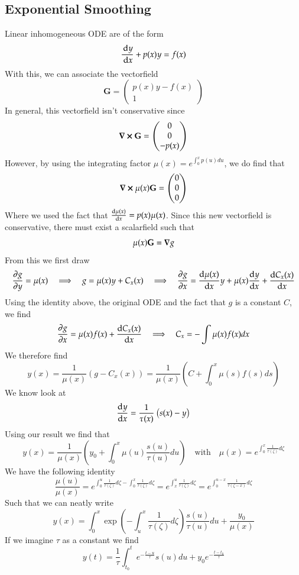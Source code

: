 \documentclass[]{scrartcl}
\begin{document}
\subsection{Exponential Smoothing}
Linear inhomogeneous ODE are of the form
$$
\frac{\dl y}{\dl x} + p(x)y = f(x) 
$$
With this, we can associate the vectorfield
$$
\mathbf{G} = 
\begin{pmatrix}
	p(x)y - f(x) \\ 1
\end{pmatrix}
$$
In general, this vectorfield isn't conservative since
$$
\curl{\mathbf{G}} = \begin{pmatrix}
	0 \\ 0 \\ -p(x)
\end{pmatrix}
$$
However, by using the integrating factor $\mu(x) = e^{\int_{0}^x p(u)du}$, we do find that
$$
\curl{\mu(x)\mathbf{G}} = \begin{pmatrix}
	0 \\ 0 \\ 0
\end{pmatrix}
$$
Where we used the fact that $\diff{\mu(x)}{x} = p(x)\mu(x)$. Since this new vectorfield is conservative, there must exist a scalarfield such that
$$
\mu(x)\mathbf{G} = \grad{g}
$$
From this we first draw
$$
\diffp{g}{y} = \mu(x) \quad \Longrightarrow \quad g = \mu(x)y + C_x(x) \quad \Longrightarrow \quad \diffp{g}{x} = \diff{\mu(x)}{x}y + \mu(x)\diff{y}{x} + \diff{C_x(x)}{x}
$$
Using the identity above, the original ODE and the fact that $g$ is a constant $C$, we find
$$
\diffp{g}{x} = \mu(x)f(x) + \diff{C_x(x)}{x} \quad \Longrightarrow \quad C_x = -\int \mu(x)f(x)dx
$$
We therefore find
$$
y(x) = \frac{1}{\mu(x)}\left(g - C_x(x)\right) = \frac{1}{\mu(x)}\left(C + \int_0^x \mu(s)f(s)ds\right)
$$
We know look at
$$
\diff{y}{x} = \frac{1}{\tau(x)}\left(s(x) - y\right)
$$
Using our result we find that
$$
y(x) = \frac{1}{\mu(x)}\left(y_0 + \int_0^x \mu(u)\frac{s(u)}{\tau(u)}du\right) \quad \text{with} \quad \mu(x) = e^{\int_0^x \frac{1}{\tau(\zeta)}d\zeta}
$$
We have the following identity
$$
\frac{\mu(u)}{\mu(x)} = e^{\int_0^u \frac{1}{\tau(\zeta)}d\zeta - \int_0^x \frac{1}{\tau(\zeta)}d\zeta} = e^{\int_x^u \frac{1}{\tau(\zeta)}d\zeta} = e^{\int_0^{u-x} \frac{1}{\tau(\zeta - x)}d\zeta}
$$
Such that we can neatly write
$$
y(x) = \int_{0}^x \exp(-\int_u^{x} \frac{1}{\tau(\zeta)}d\zeta)\frac{s(u)}{\tau(u)}du + \frac{y_0}{\mu(x)}
$$
If we imagine $\tau$ as a constant we find
$$
y(t) = \frac{1}{\tau}\int_{t_0}^{t}e^{-\frac{t-u}{\tau}}s(u)du + y_0e^{-\frac{t - t_0}{\tau}}
$$
\end{document}
